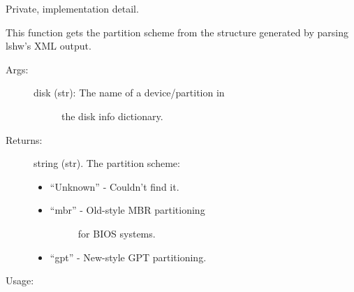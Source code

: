 \documentclass[letterpaper,10pt,english]{sphinxmanual}
\begin{document}
\begin{fulllineitems}
\label{\detokenize{linux:getdevinfo.linux.get_partitioning}}
Private, implementation detail.

This function gets the partition scheme from the
structure generated by parsing lshw’s XML output.
\begin{description}
\item[{Args:}] \leavevmode\begin{description}
\item[{disk (str):   The name of a device/partition in}] \leavevmode
the disk info dictionary.

\end{description}

\item[{Returns:}] \leavevmode
string (str). The partition scheme:
\begin{itemize}
\item {} 
“Unknown”     - Couldn’t find it.

\item {} \begin{description}
\item[{“mbr”         - Old-style MBR partitioning}] \leavevmode
for BIOS systems.

\end{description}

\item {} 
“gpt”         - New-style GPT partitioning.

\end{itemize}

\end{description}

Usage:

\begin{sphinxVerbatim}[commandchars=\\\{\}]
  
\end{sphinxVerbatim}

\end{fulllineitems}

\end{document}
